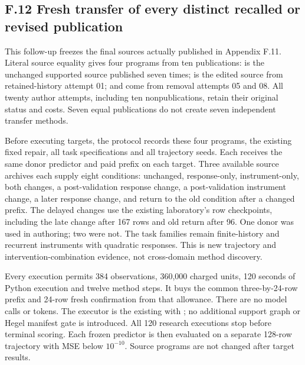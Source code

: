 \documentclass[twoside,11pt]{article}
\begin{document}
\subsection*{F.12 Fresh transfer of every distinct recalled or revised publication}

This follow-up freezes the final sources actually published in Appendix F.11. Literal source equality gives four programs from ten publications:  is the unchanged supported source published seven times;  is the edited source from retained-history attempt 01;  and  come from removal attempts 05 and 08. All twenty author attempts, including ten nonpublications, retain their original status and costs. Seven equal publications do not create seven independent transfer methods.


Before executing targets, the protocol records these four programs, the existing fixed  repair, all task specifications and all trajectory seeds. Each receives the same donor predictor and paid prefix on each target. Three available source archives each supply eight conditions: unchanged, response-only, instrument-only, both changes, a post-validation response change, a post-validation instrument change, a later response change, and return to the old condition after a changed prefix. The delayed changes use the existing laboratory's row checkpoints, including the late change after 167 rows and old return after 96. One donor was used in authoring; two were not. The task families remain finite-history and recurrent instruments with quadratic responses. This is new trajectory and intervention-combination evidence, not cross-domain method discovery.


Every execution permits 384 observations, 360,000 charged units, 120 seconds of Python execution and twelve method steps. It buys the common three-by-24-row prefix and 24-row fresh confirmation from that allowance. There are no model calls or tokens. The executor is the existing  with ; no additional support graph or Hegel manifest gate is introduced. All 120 research executions stop before terminal scoring. Each frozen predictor is then evaluated on a separate 128-row trajectory with MSE below \(10^{-10}\). Source programs are not changed after target results.
\end{document}
